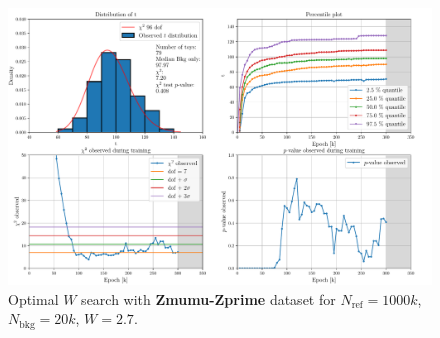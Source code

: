 \vspace{-5mm}
\begin{figure}[H]
	\centering
	\includegraphics[width=1.0\textwidth]{Python/W_CLIP/ref1000000_bkg20000_sig0/data_ref1000000_bkg20000_sig0_wclip2-7.pdf}
	\caption{Optimal $W$ search with \textbf{Zmumu-Zprime} dataset for $N_\mathrm{ref}=1000\si{k}$, $N_\mathrm{bkg}=20\si{k}$, $W=2.7$.}
	\label{fig:REF1000000_BKG20000_SIG0_WCLIP2.7}
\end{figure}







